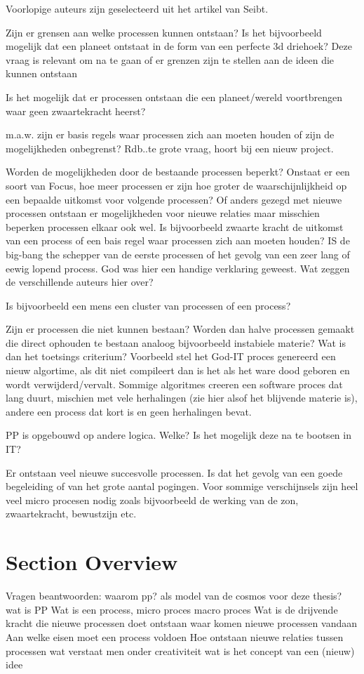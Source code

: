 \documentclass[a4paper]{Thesis}
\begin{document}
Voorlopige auteurs zijn geselecteerd uit het artikel van Seibt.

Zijn er grensen aan welke processen kunnen ontstaan? Is het bijvoorbeeld mogelijk dat een planeet ontstaat in de form van een perfecte 3d driehoek?
Deze vraag is relevant om na te gaan of er grenzen zijn te stellen aan de ideen die kunnen ontstaan

Is het mogelijk dat er processen ontstaan die een planeet/wereld voortbrengen waar geen zwaartekracht heerst?

m.a.w. zijn er basis regels waar processen zich aan moeten houden of zijn de mogelijkheden onbegrenst? 
Rdb..te grote vraag, hoort bij een nieuw project.

Worden de mogelijkheden door de bestaande processen beperkt? Onstaat er een soort van Focus, hoe meer processen er zijn hoe groter de waarschijnlijkheid op een bepaalde uitkomst voor volgende processen? Of anders gezegd met nieuwe processen ontstaan er mogelijkheden voor nieuwe relaties maar misschien beperken processen elkaar ook wel.
Is bijvoorbeeld zwaarte kracht de uitkomst van een process of een bais regel waar processen zich aan moeten houden?
IS de big-bang the schepper van de eerste processen of het gevolg van een zeer lang of eewig lopend process. God was hier een handige verklaring geweest.
Wat zeggen de verschillende auteurs hier over?

Is bijvoorbeeld een mens een cluster van processen of een process?

Zijn er processen die niet kunnen bestaan? Worden dan halve processen gemaakt die direct ophouden te bestaan analoog bijvoorbeeld instabiele materie?
Wat is dan het toetsings criterium? Voorbeeld stel het God-IT proces genereerd een nieuw algortime, als dit niet compileert dan is het als het ware dood geboren en wordt verwijderd/vervalt. Sommige algoritmes creeren een software proces dat lang duurt, mischien met vele herhalingen (zie hier alsof het blijvende materie is), andere een process dat kort is en geen herhalingen bevat.

PP is opgebouwd op andere logica. Welke? Is het mogelijk deze na te bootsen in IT?

Er ontstaan veel nieuwe succesvolle processen. Is dat het gevolg van een goede begeleiding of van het grote aantal pogingen. Voor sommige verschijnsels zijn heel veel micro procesen nodig zoals bijvoorbeeld de werking van de zon, zwaartekracht, bewustzijn etc.

\section{Section Overview}
Vragen beantwoorden:
waarom pp? als model van de cosmos voor deze thesis?
wat is PP
Wat is een process, micro proces macro proces
Wat is de drijvende kracht die nieuwe processen doet ontstaan
waar komen nieuwe processen vandaan
Aan welke eisen moet een process voldoen
Hoe ontstaan nieuwe relaties tussen processen
wat verstaat men onder creativiteit
wat is het concept van een (nieuw) idee
\end{document}
